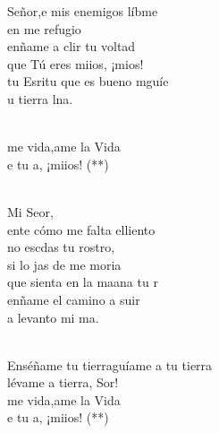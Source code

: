 \begin{cancion}%
	 Señor,e mis enemigos líbme\\
	en  me refugio\\
	enñame a clir tu voltad\\
	que Tú eres miios, ¡mios!\\
	tu Esritu que es bueno mguíe\\
	 u tierra lna.\\\jump\\
	\begin{chorus}%
	me vida,ame la Vida\\
	e tu a, ¡miios! (**)\\
	\end{chorus}%
	\jump\\
	Mi Seor, \\
	ente cómo me falta elliento\\
	no escdas tu rostro, \\
	si lo jas de  me moria \\
	 que sienta en la maana tu r\\
	enñame el camino a suir  \\
	a  levanto mi ma.\\\jump\\
	\begin{chorus}%
	Enséñame tu tierraguíame a tu tierra\\
	lévame a tierra, Sor! \\
	me vida,ame la Vida\\
	e tu a, ¡miios! (**)\\
	\end{chorus}%
	\jump\\
\end{cancion}%
